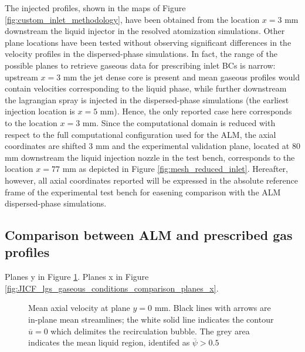 The injected profiles, shown in the maps of Figure \ref{fig:custom_inlet_methodology}, have been obtained from the location $x = 3$ mm downstream the liquid injector in the resolved atomization simulations. Other plane locations have been tested without observing significant differences in the velocity profiles in the dispersed-phase simulations. In fact, the range of the possible planes to retrieve gaseous data for prescribing inlet BCs is narrow: upstream $x = 3$ mm the jet dense core is present and mean gaseous profiles would contain velocities corresponding to the liquid phase, while further downstream the lagrangian spray is injected in the dispersed-phase simulations (the earliest injection location is $x = 5$ mm). Hence, the only reported case here corresponds to the location $x = 3$ mm. Since the computational domain is reduced with respect to the full computational configuration used for the ALM, the axial coordinates are shifted 3 mm and the experimental validation plane, located at 80 mm downstream the liquid injection nozzle in the test bench, corresponds to the location $x = 77$ mm as depicted in Figure \ref{fig:mesh_reduced_inlet}. Hereafter, however, all axial coordinates reported will be expressed in the absolute reference frame of the experimental test bench for easening comparison with the ALM dispersed-phase simulations.



\subsection{Comparison between ALM and prescribed gas profiles}

Planes y in Figure \ref{fig:JICF_lgs_gaseous_conditions_comparison_plane_y}. Planes x in Figure \ref{fig:JICF_lgs_gaseous_conditions_comparison_planes_x}. 

\begin{figure}[ht]
\centering
\caption[Mean axial velocity at plane $y = 0$ mm.]{Mean axial velocity at plane $y = 0$ mm. Black lines with arrows are in-plane mean streamlines; the white solid line indicates the contour $\overline{u} = 0$ which delimites the recirculation bubble. The grey area  indicates the mean liquid region, identifed as $\overline{\psi} > 0.5$}
\label{fig:JICF_lgs_gaseous_conditions_comparison_plane_y}
\end{figure}


